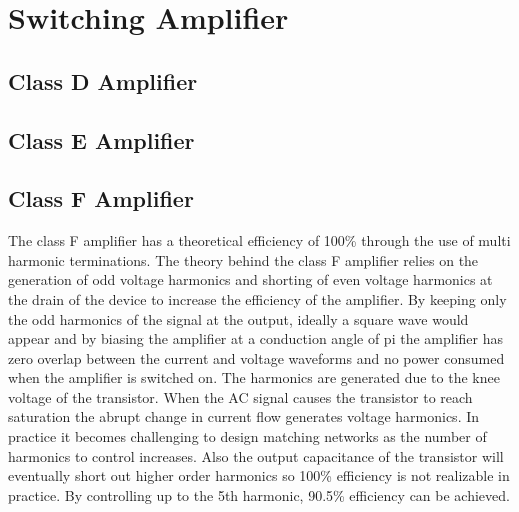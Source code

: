 \section{Switching Amplifier}

\subsection{Class D Amplifier}

\subsection{Class E Amplifier}



\subsection{Class F Amplifier}

The class F amplifier has a theoretical efficiency of 100\% through the use of multi harmonic terminations. The theory behind the class F amplifier relies on the generation of odd voltage harmonics and shorting of even voltage harmonics at the drain of the device to increase the efficiency of the amplifier. By keeping only the odd harmonics of the signal at the output, ideally a square wave would appear and by biasing the amplifier at a conduction angle of pi the amplifier has zero overlap between the current and voltage waveforms and no power consumed when the amplifier is switched on.
The harmonics are generated due to the knee voltage of the transistor. When the AC signal causes the transistor to reach saturation the abrupt change in current flow generates voltage harmonics. In practice it becomes challenging to design matching networks as the number of harmonics to control increases. Also the output capacitance of the transistor will eventually short out higher order harmonics so 100\% efficiency is not realizable in practice. By controlling up to the 5th harmonic, 90.5\% efficiency can be achieved.

